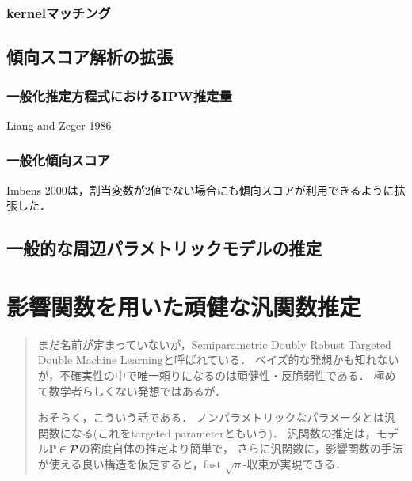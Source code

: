 \documentclass[uplatex,dvipdfmx]{jsreport}
\begin{document}
\subsection{kernelマッチング}

\section{傾向スコア解析の拡張}

\subsection{一般化推定方程式におけるIPW推定量}

\begin{tcolorbox}[colframe=ForestGreen, colback=ForestGreen!10!white,breakable,colbacktitle=ForestGreen!40!white,coltitle=black,fonttitle=\bfseries\sffamily,
title=]
    Liang and Zeger 1986
\end{tcolorbox}

\subsection{一般化傾向スコア}

\begin{tcolorbox}[colframe=ForestGreen, colback=ForestGreen!10!white,breakable,colbacktitle=ForestGreen!40!white,coltitle=black,fonttitle=\bfseries\sffamily,
title=]
    Imbens 2000は，割当変数が2値でない場合にも傾向スコアが利用できるように拡張した．
\end{tcolorbox}

\section{一般的な周辺パラメトリックモデルの推定}

\chapter{影響関数を用いた頑健な汎関数推定}

\begin{quotation}
    まだ名前が定まっていないが，Semiparametric Doubly Robust Targeted Double Machine Learningと呼ばれている．
    ベイズ的な発想かも知れないが，不確実性の中で唯一頼りになるのは頑健性・反脆弱性である．
    極めて数学者らしくない発想ではあるが．

    おそらく，こういう話である．
    ノンパラメトリックなパラメータとは汎関数になる(これをtargeted parameterともいう)．
    汎関数の推定は，モデル$\mathbb{P}\in\mathcal{P}$の密度自体の推定より簡単で，
    さらに汎関数に，影響関数の手法が使える良い構造を仮定すると，fast $\sqrt{n}$-収束が実現できる．
\end{quotation}
\end{document}
